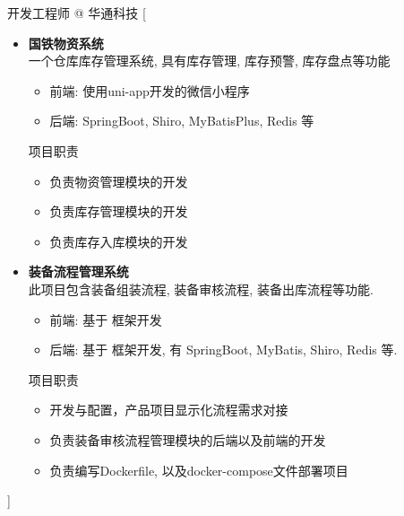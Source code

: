 \documentclass[zh]{resume}
\begin{document}
\begin{experiences}
	{开发工程师 @ 华通科技 }%
	[\begin{itemize}
			\item {\textbf{国铁物资系统}}\\
			      一个仓库库存管理系统, 具有库存管理, 库存预警, 库存盘点等功能
			      \begin{itemize}
				      \item 前端: 使用uni-app开发的微信小程序
				      \item 后端: SpringBoot, Shiro, MyBatisPlus, Redis 等
			      \end{itemize}
			      项目职责
			      \begin{itemize}
              \item 负责物资管理模块的开发
              \item 负责库存管理模块的开发
              \item 负责库存入库模块的开发
			      \end{itemize}
			\item {\textbf{装备流程管理系统}} \\
			      此项目包含装备组装流程, 装备审核流程, 装备出库流程等功能.
			      \begin{itemize}
				      \item 前端: 基于 框架开发
				      \item 后端: 基于 框架开发, 有 SpringBoot, MyBatis, Shiro, Redis 等.
			      \end{itemize}
			      项目职责
			      \begin{itemize}
				      \item 开发与配置，产品项目显示化流程需求对接
				      \item 负责装备审核流程管理模块的后端以及前端的开发
				      \item 负责编写Dockerfile, 以及docker-compose文件部署项目
			      \end{itemize}
		\end{itemize}]
	\separator{0.5ex}

\end{experiences}
\end{document}
